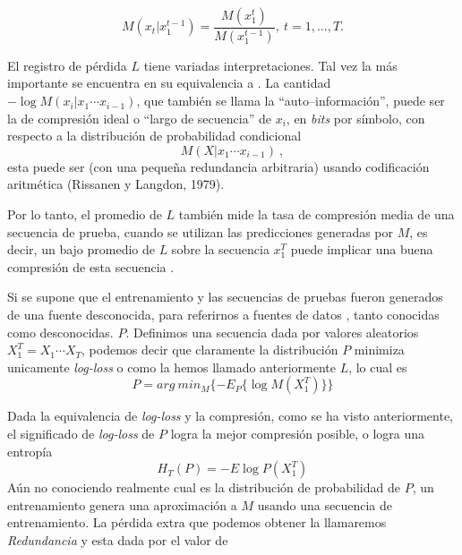\begin{equation}
M(x_{t} | x_{1}^{t-1} ) =  \dfrac{M(x_{1}^{t})}{M(x_{1}^{t-1} )},\ t=1,...,T.
\end{equation}


El registro de pérdida $L$ tiene variadas interpretaciones. Tal vez la más importante se encuentra en su equivalencia a \LDC. La cantidad $-\log M (x_{i} | x_{1} \cdots x_{i-1}) $, que también se llama la ``auto--información'', puede ser la de compresión ideal o ``largo de secuencia'' de $x_{i}$, en \emph{bits} por símbolo, con respecto a la distribución de probabilidad condicional  \begin{equation}M (X | x_{1} \cdots x_{i-1}) \ ,\end{equation} esta puede ser  \online(con  una pequeña redundancia arbitraria) usando codificación aritmética (Rissanen y Langdon, 1979)\cite{RissanenLangdon1979}.


Por lo tanto, el promedio de $L$ también mide la tasa de compresión media de una secuencia de prueba, cuando se utilizan las predicciones generadas por $M$, es decir, un bajo promedio de $L$ %
sobre la secuencia $x_{1}^{T}$ puede implicar una buena compresión de esta secuencia \cite{Begleiter2004}.

Si se supone que el entrenamiento y las secuencias de pruebas fueron generados de una fuente desconocida, para referirnos a fuentes de datos , tanto conocidas como desconocidas. $P$. Definimos una secuencia dada por valores aleatorios $X_{1}^{T} = X_{1} \cdots X_{T} $, podemos decir que claramente la distribución $P$ minimiza unicamente \emph{log-loss} o como la hemos llamado anteriormente $L$, lo cual es \begin{equation}
P = arg\ min_{M} \{ - E_{P} \{\log M( X_{1}^{T} )\}   \}
\end{equation}


Dada la equivalencia de \emph{log-loss} y la compresión, como se ha visto anteriormente, el significado de \emph{log-loss} de $P$ logra la mejor compresión posible, o logra una entropía 
\begin{equation}
	H_{T}(P) = - E \log P( X_{1}^{T} ) 
\end{equation}
Aún no conociendo realmente cual es la distribución de probabilidad de $P$, un entrenamiento genera una aproximación a $M$ usando una secuencia de entrenamiento. La pérdida extra que podemos obtener la llamaremos \emph{Redundancia} y esta dada por el valor de

